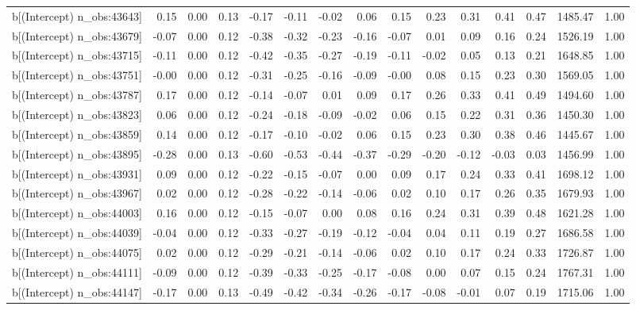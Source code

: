 \begin{table}[ht]
\begin{tabular}{rrrrrrrrrrrrrrr}
  b[(Intercept) n\_obs:43643] & 0.15 & 0.00 & 0.13 & -0.17 & -0.11 & -0.02 & 0.06 & 0.15 & 0.23 & 0.31 & 0.41 & 0.47 & 1485.47 & 1.00 \\ 
  b[(Intercept) n\_obs:43679] & -0.07 & 0.00 & 0.12 & -0.38 & -0.32 & -0.23 & -0.16 & -0.07 & 0.01 & 0.09 & 0.16 & 0.24 & 1526.19 & 1.00 \\ 
  b[(Intercept) n\_obs:43715] & -0.11 & 0.00 & 0.12 & -0.42 & -0.35 & -0.27 & -0.19 & -0.11 & -0.02 & 0.05 & 0.13 & 0.21 & 1648.85 & 1.00 \\ 
  b[(Intercept) n\_obs:43751] & -0.00 & 0.00 & 0.12 & -0.31 & -0.25 & -0.16 & -0.09 & -0.00 & 0.08 & 0.15 & 0.23 & 0.30 & 1569.05 & 1.00 \\ 
  b[(Intercept) n\_obs:43787] & 0.17 & 0.00 & 0.12 & -0.14 & -0.07 & 0.01 & 0.09 & 0.17 & 0.26 & 0.33 & 0.41 & 0.49 & 1494.60 & 1.00 \\ 
  b[(Intercept) n\_obs:43823] & 0.06 & 0.00 & 0.12 & -0.24 & -0.18 & -0.09 & -0.02 & 0.06 & 0.15 & 0.22 & 0.31 & 0.36 & 1450.30 & 1.00 \\ 
  b[(Intercept) n\_obs:43859] & 0.14 & 0.00 & 0.12 & -0.17 & -0.10 & -0.02 & 0.06 & 0.15 & 0.23 & 0.30 & 0.38 & 0.46 & 1445.67 & 1.00 \\ 
  b[(Intercept) n\_obs:43895] & -0.28 & 0.00 & 0.13 & -0.60 & -0.53 & -0.44 & -0.37 & -0.29 & -0.20 & -0.12 & -0.03 & 0.03 & 1456.99 & 1.00 \\ 
  b[(Intercept) n\_obs:43931] & 0.09 & 0.00 & 0.12 & -0.22 & -0.15 & -0.07 & 0.00 & 0.09 & 0.17 & 0.24 & 0.33 & 0.41 & 1698.12 & 1.00 \\ 
  b[(Intercept) n\_obs:43967] & 0.02 & 0.00 & 0.12 & -0.28 & -0.22 & -0.14 & -0.06 & 0.02 & 0.10 & 0.17 & 0.26 & 0.35 & 1679.93 & 1.00 \\ 
  b[(Intercept) n\_obs:44003] & 0.16 & 0.00 & 0.12 & -0.15 & -0.07 & 0.00 & 0.08 & 0.16 & 0.24 & 0.31 & 0.39 & 0.48 & 1621.28 & 1.00 \\ 
  b[(Intercept) n\_obs:44039] & -0.04 & 0.00 & 0.12 & -0.33 & -0.27 & -0.19 & -0.12 & -0.04 & 0.04 & 0.11 & 0.19 & 0.27 & 1686.58 & 1.00 \\ 
  b[(Intercept) n\_obs:44075] & 0.02 & 0.00 & 0.12 & -0.29 & -0.21 & -0.14 & -0.06 & 0.02 & 0.10 & 0.17 & 0.24 & 0.33 & 1726.87 & 1.00 \\ 
  b[(Intercept) n\_obs:44111] & -0.09 & 0.00 & 0.12 & -0.39 & -0.33 & -0.25 & -0.17 & -0.08 & 0.00 & 0.07 & 0.15 & 0.24 & 1767.31 & 1.00 \\ 
  b[(Intercept) n\_obs:44147] & -0.17 & 0.00 & 0.13 & -0.49 & -0.42 & -0.34 & -0.26 & -0.17 & -0.08 & -0.01 & 0.07 & 0.19 & 1715.06 & 1.00 \\ 

\end{tabular}
\end{table}
